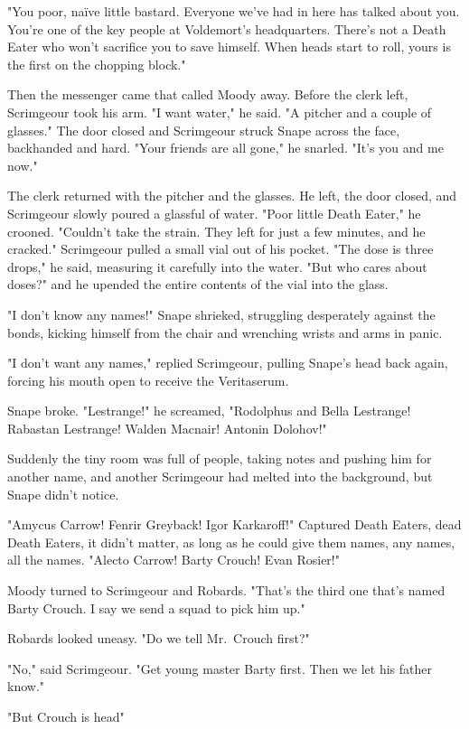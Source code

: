 "You poor, naïve little bastard. Everyone we've had in here has talked about you. You're one of the key people at Voldemort's headquarters. There's not a Death Eater who won't sacrifice you to save himself. When heads start to roll, yours is the first on the chopping block."

Then the messenger came that called Moody away. Before the clerk left, Scrimgeour took his arm. "I want water," he said. "A pitcher and a couple of glasses." The door closed and Scrimgeour struck Snape across the face, backhanded and hard. "Your friends are all gone," he snarled. "It's you and me now."

The clerk returned with the pitcher and the glasses. He left, the door closed, and Scrimgeour slowly poured a glassful of water. "Poor little Death Eater," he crooned. "Couldn't take the strain. They left for just a few minutes, and he cracked." Scrimgeour pulled a small vial out of his pocket. "The dose is three drops," he said, measuring it carefully into the water. "But who cares about doses?" and he upended the entire contents of the vial into the glass.

"I don't know any names!" Snape shrieked, struggling desperately against the bonds, kicking himself from the chair and wrenching wrists and arms in panic.

"I don't want any names," replied Scrimgeour, pulling Snape's head back again, forcing his mouth open to receive the Veritaserum.

Snape broke. "Lestrange!" he screamed, "Rodolphus and Bella Lestrange! Rabastan Lestrange! Walden Macnair! Antonin Dolohov!"

Suddenly the tiny room was full of people, taking notes and pushing him for another name, and another{\el} Scrimgeour had melted into the background, but Snape didn't notice.

"Amycus Carrow! Fenrir Greyback! Igor Karkaroff!" Captured Death Eaters, dead Death Eaters, it didn't matter, as long as he could give them names, any names, all the names. "Alecto Carrow! Barty Crouch! Evan Rosier!"

Moody turned to Scrimgeour and Robards. "That's the third one that's named Barty Crouch. I say we send a squad to pick him up."

Robards looked uneasy. "Do we tell Mr.~Crouch first?"

"No," said Scrimgeour. "Get young master Barty first. Then we let his father know."

"But Crouch is head{\el}"

